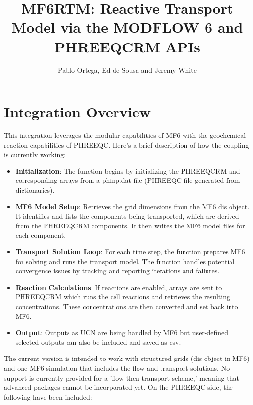 \documentclass{article}
\title{MF6RTM: Reactive Transport Model via the MODFLOW 6 and PHREEQCRM APIs}
\author{Pablo Ortega, Ed de Sousa and Jeremy White}
\begin{document}
\maketitle


\section{Integration Overview}
This integration leverages the modular capabilities of MF6 with the geochemical reaction capabilities of PHREEQC. Here’s a brief description of how the coupling is currently working:

\begin{itemize}

    \item \textbf{Initialization}: The function begins by initializing the PHREEQCRM and corresponding arrays from a phinp.dat file (PHREEQC file generated from dictionaries).

    \item \textbf{MF6 Model Setup}: Retrieves the grid dimensions from the MF6 dis object. It identifies and lists the components being transported, which are derived from the PHREEQCRM components. It then writes the MF6 model files for each component.
    
    \item \textbf{Transport Solution Loop}: For each time step, the function prepares MF6 for solving and runs the transport model. The function handles potential convergence issues by tracking and reporting iterations and failures.
    
    \item \textbf{Reaction Calculations}: If reactions are enabled, arrays are sent to PHREEQCRM which runs the cell reactions and retrieves the resulting concentrations. These concentrations are then converted and set back into MF6.
    
    \item \textbf{Output}: Outputs as UCN are being handled by MF6 but user-defined selected outputs can also be included and saved as csv.

\end{itemize}

The current version is intended to work with structured grids (dis object in MF6) and one MF6 simulation that includes the flow and transport solutions. No support is currently provided for a 'flow then transport scheme,' meaning that advanced packages cannot be incorporated yet. On the PHREEQC side, the following have been included:
\end{document}
